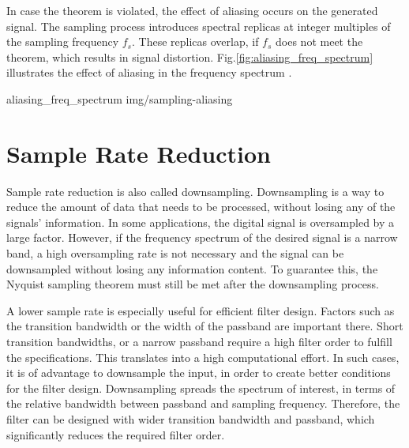 In case the theorem is violated, the effect of aliasing occurs on the generated signal.
The sampling process introduces spectral replicas at integer multiples of the sampling frequency $f_s$.
These replicas overlap, if $f_s$ does not meet the theorem, which results in signal distortion.
Fig.\ref{fig:aliasing_freq_spectrum} illustrates the effect of aliasing in the frequency spectrum \cite{ThyagarajanK.S2019ItDS}.

 {aliasing_freq_spectrum} {img/sampling-aliasing}

\section{Sample Rate Reduction}

Sample rate reduction is also called downsampling.
Downsampling is a way to reduce the amount of data that needs to be processed, without losing any of the signals' information.
In some applications, the digital signal is oversampled by a large factor.
However, if the frequency spectrum of the desired signal is a narrow band, a high oversampling rate is not necessary and the signal can be downsampled without losing any information content.
To guarantee this, the Nyquist sampling theorem must still be met after the downsampling process.

A lower sample rate is especially useful for efficient filter design.
Factors such as the transition bandwidth or the width of the passband are important there.
Short transition bandwidths, or a narrow passband require a high filter order to fulfill the specifications.
This translates into a high computational effort.
In such cases, it is of advantage to downsample the input, in order to create better conditions for the filter design.
Downsampling spreads the spectrum of interest, in terms of the relative bandwidth between passband and sampling frequency.
Therefore, the filter can be designed with wider transition bandwidth and passband, which significantly reduces the required filter order.\\

